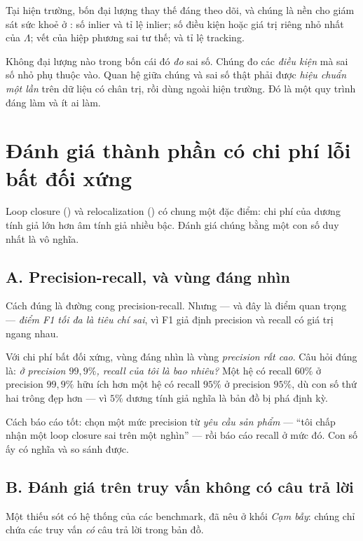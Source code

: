 \documentclass[../../vslam.tex]{subfiles}
\begin{document}
Tại hiện trường, bốn đại lượng thay thế đáng theo dõi, và chúng là nền cho giám sát sức khoẻ ở : số inlier và tỉ lệ inlier; số điều kiện hoặc giá trị riêng nhỏ nhất của \(\Lambda\); vết của hiệp phương sai tư thế; và tỉ lệ tracking.

Không đại lượng nào trong bốn cái đó \emph{đo} sai số. Chúng đo các \emph{điều kiện} mà sai số nhỏ phụ thuộc vào. Quan hệ giữa chúng và sai số thật phải được \emph{hiệu chuẩn một lần} trên dữ liệu có chân trị, rồi dùng ngoài hiện trường. Đó là một quy trình đáng làm và ít ai làm.

\section{Đánh giá thành phần có chi phí lỗi bất đối xứng}

Loop closure () và relocalization () có chung một đặc điểm: chi phí của dương tính giả lớn hơn âm tính giả nhiều bậc. Đánh giá chúng bằng một con số duy nhất là vô nghĩa.

\subsection{A. Precision-recall, và vùng đáng nhìn}

Cách đúng là đường cong precision-recall. Nhưng --- và đây là điểm quan trọng --- \emph{điểm F1 tối đa là tiêu chí sai}, vì F1 giả định precision và recall có giá trị ngang nhau.

Với chi phí bất đối xứng, vùng đáng nhìn là vùng \emph{precision rất cao}. Câu hỏi đúng là: \emph{ở precision \(99{,}9\%\), recall của tôi là bao nhiêu?} Một hệ có recall \(60\%\) ở precision \(99{,}9\%\) hữu ích hơn một hệ có recall \(95\%\) ở precision \(95\%\), dù con số thứ hai trông đẹp hơn --- vì \(5\%\) dương tính giả nghĩa là bản đồ bị phá định kỳ.

Cách báo cáo tốt: chọn một mức precision từ \emph{yêu cầu sản phẩm} --- ``tôi chấp nhận một loop closure sai trên một nghìn'' --- rồi báo cáo recall ở mức đó. Con số ấy có nghĩa và so sánh được.

\subsection{B. Đánh giá trên truy vấn không có câu trả lời}

Một thiếu sót có hệ thống của các benchmark, đã nêu ở  khối \emph{Cạm bẫy}: chúng chỉ chứa các truy vấn \emph{có} câu trả lời trong bản đồ.
\end{document}
